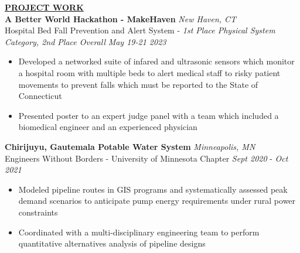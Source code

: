 \documentclass{article}
\begin{document}
\noindent \textbf{\large\underline{PROJECT WORK}} \\
\noindent \textbf{A Better World Hackathon - MakeHaven}  \hfill  \textit{New Haven, CT}\\
\noindent Hospital Bed Fall Prevention and Alert System - \textit{1st Place Physical System Category, 2nd Place Overall} \hfill \textit{May 19-21 2023}
\begin{itemize}[noitemsep,nolistsep]
\item {Developed a networked suite of infared and ultrasonic sensors which monitor a hospital room with multiple beds to alert medical staff to risky patient movements to prevent falls which must be reported to the State of Connecticut}
\item {Presented poster to an expert judge panel with a team which included a biomedical engineer and an experienced physician}
\end{itemize}
\vspace{3 pt}
\noindent \textbf{Chirijuyu, Gautemala Potable Water System} \hfill  \textit{Minneapolis, MN}\\
\noindent Engineers Without Borders - University of Minnesota Chapter \hfill \textit{Sept 2020} - \textit{Oct 2021}
\begin{itemize}[noitemsep,nolistsep]
\item {Modeled pipeline routes in GIS programs and systematically assessed peak demand scenarios to anticipate pump energy requirements under rural power constraints}
\item {Coordinated with a multi-disciplinary engineering team to perform quantitative alternatives analysis of pipeline designs}
\end{itemize}
\begin{comment}
\vspace{3 pt}
\noindent \textbf{Green Diesel Plant Simulation - Senior Project} \hfill  \textit{Minneapolis, MN}\\
\noindent {Senior Design Project - Univ. of Minnesota Dept. of Chemical Engineering and Materials Science} \hfill \textit{Jan 2021} - \textit{May 2021}
\begin{itemize}[noitemsep,nolistsep]
\item {Collaborated with classmates to develop Aspen Plus and Python model for industrial-scale poly(oxymethylene) dimethyl ether production plant, a green diesel alternative with non-linear reaction kinetics}
\end{itemize}
\noindent \textbf{Hand Prosthetic - Engineering World Health} \hfill  \textit{Sept 2017} - \textit{Feb 2018}
\begin{itemize}[noitemsep,nolistsep]
\item {Designed and tested component hardware such as bearings, pins, and couplings as part of student-led effort to make a prosthetic hand for a local amputee}
\item {Benchmarked fabricated components and modeled internal forces for which limits were provided by FEM framework in Simulink}
\end{itemize}
\end{comment}
\end{document}

